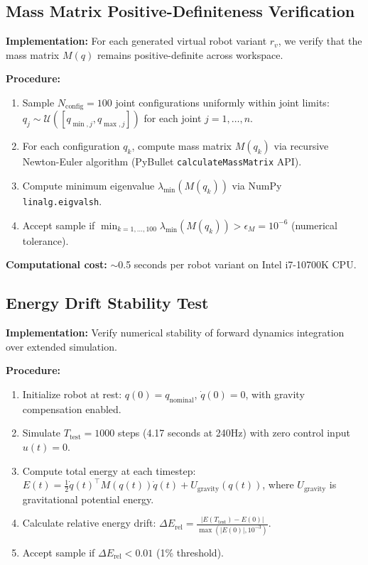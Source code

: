 \documentclass[DTMColor]{ROB-New}
\begin{document}
\subsection{Mass Matrix Positive-Definiteness Verification}

\textbf{Implementation:} For each generated virtual robot variant $r_v$, we verify that the mass matrix $M(q)$ remains positive-definite across workspace.

\textbf{Procedure:}
\begin{enumerate}[leftmargin=*, itemsep=1pt]
    \item Sample $N_{\text{config}}=100$ joint configurations uniformly within joint limits: $q_j \sim \mathcal{U}([q_{\min,j}, q_{\max,j}])$ for each joint $j=1,\ldots,n$.
    \item For each configuration $q_k$, compute mass matrix $M(q_k)$ via recursive Newton-Euler algorithm (PyBullet \texttt{calculateMassMatrix} API).
    \item Compute minimum eigenvalue $\lambda_{\min}(M(q_k))$ via NumPy \texttt{linalg.eigvalsh}.
    \item Accept sample if $\min_{k=1,\ldots,100} \lambda_{\min}(M(q_k)) > \epsilon_M = 10^{-6}$ (numerical tolerance).
\end{enumerate}

\textbf{Computational cost:} $\sim$0.5 seconds per robot variant on Intel i7-10700K CPU.

\subsection{Energy Drift Stability Test}

\textbf{Implementation:} Verify numerical stability of forward dynamics integration over extended simulation.

\textbf{Procedure:}
\begin{enumerate}[leftmargin=*, itemsep=1pt]
    \item Initialize robot at rest: $q(0)=q_{\text{nominal}}$, $\dot{q}(0)=0$, with gravity compensation enabled.
    \item Simulate $T_{\text{test}}=1000$ steps (4.17 seconds at 240Hz) with zero control input $u(t)=0$.
    \item Compute total energy at each timestep: $E(t) = \frac{1}{2}\dot{q}(t)^\top M(q(t))\dot{q}(t) + U_{\text{gravity}}(q(t))$, where $U_{\text{gravity}}$ is gravitational potential energy.
    \item Calculate relative energy drift: $\Delta E_{\text{rel}} = \frac{|E(T_{\text{test}}) - E(0)|}{\max(|E(0)|, 10^{-3})}$.
    \item Accept sample if $\Delta E_{\text{rel}} < 0.01$ (1\% threshold).
\end{enumerate}
\end{document}
